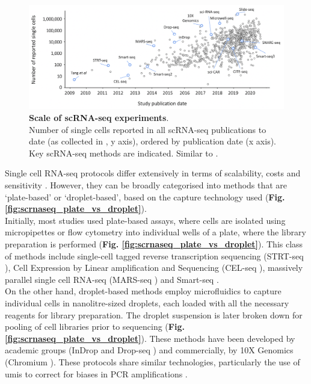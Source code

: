 \begin{figure}[h]
\centering
\includegraphics[width=16cm]{Chapter3/Fig/scrnaseq_ncells.png}
\caption[scRNA-seq technologies]{\textbf{Scale of scRNA-seq experiments}.\\
Number of single cells reported in all scRNA-seq publications to date (as collected in \cite{svensson2020single}, y axis), ordered by publication date (x axis).
Key scRNA-seq methods are indicated.
Similar to \cite{svensson2018exponential}.}
\label{fig:scrnaseq_technologies}
\end{figure}

Single cell RNA-seq protocols differ extensively in terms of scalability, costs and sensitivity \cite{ziegenhain2017comparative, svensson2018exponential}.
However, they can be broadly categorised into methods that are `plate-based' or `droplet-based', based on the capture technology used (\textbf{Fig. \ref{fig:scrnaseq_plate_vs_droplet}}).\\

Initially, most studies used plate-based assays, where cells are isolated using micropipettes or flow cytometry into individual wells of a plate, where the library preparation is performed (\textbf{Fig. \ref{fig:scrnaseq_plate_vs_droplet}}).
This class of methods include single-cell tagged reverse transcription sequencing (STRT-seq \cite{islam2011characterization}), Cell Expression by Linear amplification and Sequencing (CEL-seq \cite{hashimshony2012cel}), massively parallel single cell RNA-seq (MARS-seq \cite{jaitin2014massively}) and Smart-seq \cite{ramskold2012full, picelli2013smart, hagemann2020single}. \\

On the other hand, droplet-based methods employ microfluidics to capture individual cells in nanolitre-sized droplets, each loaded with all the necessary reagents for library preparation.
The droplet suspension is later broken down for pooling of cell libraries prior to sequencing (\textbf{Fig. \ref{fig:scrnaseq_plate_vs_droplet}}). 
These methods have been developed by academic groups (InDrop \cite{klein2015droplet} and Drop-seq \cite{macosko2015highly}) and commercially, by 10X Genomics (Chromium \cite{zheng2017massively}). 
These protocols share similar technologies, particularly the use of \glspl{umi} to correct for biases in PCR amplifications \cite{kivioja2012counting}. \\

